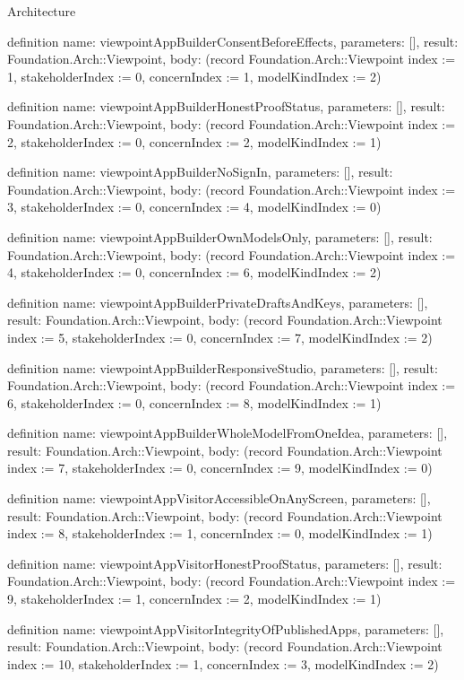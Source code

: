\begin{lexlean}{Architecture}
\begin{semanticmodule}
definition{
  name: viewpointAppBuilderConsentBeforeEffects,
  parameters: [],
  result: Foundation.Arch::Viewpoint,
  body: (record Foundation.Arch::Viewpoint {index := 1, stakeholderIndex := 0, concernIndex := 1, modelKindIndex := 2})
}

definition{
  name: viewpointAppBuilderHonestProofStatus,
  parameters: [],
  result: Foundation.Arch::Viewpoint,
  body: (record Foundation.Arch::Viewpoint {index := 2, stakeholderIndex := 0, concernIndex := 2, modelKindIndex := 1})
}

definition{
  name: viewpointAppBuilderNoSignIn,
  parameters: [],
  result: Foundation.Arch::Viewpoint,
  body: (record Foundation.Arch::Viewpoint {index := 3, stakeholderIndex := 0, concernIndex := 4, modelKindIndex := 0})
}

definition{
  name: viewpointAppBuilderOwnModelsOnly,
  parameters: [],
  result: Foundation.Arch::Viewpoint,
  body: (record Foundation.Arch::Viewpoint {index := 4, stakeholderIndex := 0, concernIndex := 6, modelKindIndex := 2})
}

definition{
  name: viewpointAppBuilderPrivateDraftsAndKeys,
  parameters: [],
  result: Foundation.Arch::Viewpoint,
  body: (record Foundation.Arch::Viewpoint {index := 5, stakeholderIndex := 0, concernIndex := 7, modelKindIndex := 2})
}

definition{
  name: viewpointAppBuilderResponsiveStudio,
  parameters: [],
  result: Foundation.Arch::Viewpoint,
  body: (record Foundation.Arch::Viewpoint {index := 6, stakeholderIndex := 0, concernIndex := 8, modelKindIndex := 1})
}

definition{
  name: viewpointAppBuilderWholeModelFromOneIdea,
  parameters: [],
  result: Foundation.Arch::Viewpoint,
  body: (record Foundation.Arch::Viewpoint {index := 7, stakeholderIndex := 0, concernIndex := 9, modelKindIndex := 0})
}

definition{
  name: viewpointAppVisitorAccessibleOnAnyScreen,
  parameters: [],
  result: Foundation.Arch::Viewpoint,
  body: (record Foundation.Arch::Viewpoint {index := 8, stakeholderIndex := 1, concernIndex := 0, modelKindIndex := 1})
}

definition{
  name: viewpointAppVisitorHonestProofStatus,
  parameters: [],
  result: Foundation.Arch::Viewpoint,
  body: (record Foundation.Arch::Viewpoint {index := 9, stakeholderIndex := 1, concernIndex := 2, modelKindIndex := 1})
}

definition{
  name: viewpointAppVisitorIntegrityOfPublishedApps,
  parameters: [],
  result: Foundation.Arch::Viewpoint,
  body: (record Foundation.Arch::Viewpoint {index := 10, stakeholderIndex := 1, concernIndex := 3, modelKindIndex := 2})
}


\end{semanticmodule}
\end{lexlean}

